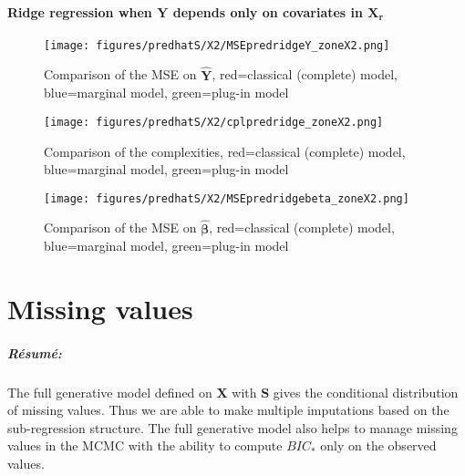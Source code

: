 \documentclass[12pt,a4paper]{report}
\begin{document}
\subsubsection{Ridge regression when $\boldsymbol{Y}$ depends only on covariates in $\boldsymbol{X_r}$}

\begin{figure}[h!]
	\centering
		  \texttt{[image: figures/predhatS/X2/MSEpredridgeY\_zoneX2.png]}
		\caption{Comparison of the MSE on $\hat{\boldsymbol{Y}}$, red=classical (complete) model, blue=marginal model, green=plug-in model}\label{MSEpredridgeY_zoneX2}
	\end{figure}
	\begin{figure}[h!]
	\centering
		  \texttt{[image: figures/predhatS/X2/cplpredridge\_zoneX2.png]}
		\caption{Comparison of the complexities, red=classical (complete) model, blue=marginal model, green=plug-in model}\label{cplpredridge_zoneX2}
	\end{figure}
	\begin{figure}[h!]
	\centering
		  \texttt{[image: figures/predhatS/X2/MSEpredridgebeta\_zoneX2.png]}
		\caption{Comparison of the MSE on $\hat{\boldsymbol{\beta}}$, red=classical (complete) model, blue=marginal model, green=plug-in model}\label{MSEpredridgebeta_zoneX2}
	\end{figure}
	\FloatBarrier

\FloatBarrier

\chapter{Missing values} \label{chapmiss}
	\paragraph{Résumé:} The full generative model defined on $\boldsymbol{X}$ with $\boldsymbol{S}$ gives the conditional distribution of missing values. Thus we are able to make multiple imputations based on the sub-regression structure. The full generative model also helps to manage missing values in the MCMC with the ability to compute $BIC_*$ only on the observed values. 
	
\end{document}
